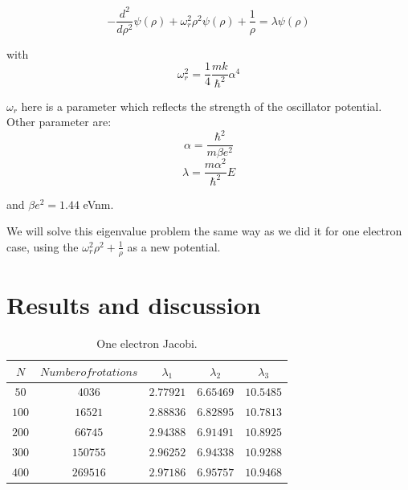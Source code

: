 \documentclass[10pt]{article}
\begin{document}
	\begin{equation}
		-\frac{d^{2}}{d\rho ^{2}}\psi (\rho )+\omega _{r}^{2}\rho ^{2}\psi (\rho )+%
		\frac{1}{\rho }=\lambda \psi (\rho )
	\end{equation}
	
	with 
	\begin{equation}
		\omega _{r}^{2}=\frac{1}{4}\frac{mk}{\hbar ^{2}}\alpha ^{4}
	\end{equation}
	
	$\omega _{r}$ here is a parameter which reflects the strength of the
	oscillator potential. Other parameter are:%
	\begin{equation}
		\alpha =\frac{\hbar ^{2}}{m\beta e^{2}}
	\end{equation}%
	\begin{equation}
		\lambda =\frac{m\alpha ^{2}}{\hbar ^{2}}E
	\end{equation}
	
	and $\beta e^{2}=1.44$ eVnm.
	
	We will solve this eigenvalue problem the same way as we did it for one
	electron case, using the $\omega _{r}^{2}\rho ^{2}+\frac{1}{\rho }$ as a new
	potential.
\newpage
\section{Results and discussion}

\begin{table}
  \caption{One electron Jacobi.}
  \label{tab:one}
  \begin{center}
    \begin{tabular}{c|c|c|c|c}
    \hline
		$N$ & $Number of rotations$ & $\lambda_1$ & $\lambda_2$ & $\lambda_3$ \\
        \hline
	$	50 $  & $ 4036  $ & $2.77921$ & $6.65469$ & $10.5485$ \\
	$	100$  & $ 16521 $ & $2.88836$ & $6.82895$ & $10.7813$ \\
	$	200$  & $ 66745 $ & $2.94388$ & $6.91491$ & $10.8925$ \\
	$	300$  & $ 150755$ & $2.96252$ & $6.94338$ & $10.9288$ \\
	$	400$  & $ 269516$ & $2.97186$ & $6.95757$ & $10.9468$ \\

	\end{tabular}
  \end{center}
\end{table}
\end{document}
